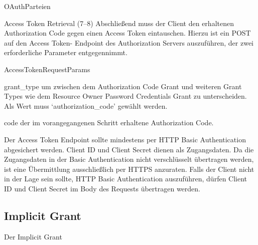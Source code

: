 \begin{labeling}{OAuthParteien}
    \item [Access Token Retrieval (7--8)]
    Abschließend muss der Client den erhaltenen Authorization Code gegen
    einen Access Token eintauschen. Hierzu ist ein POST auf den Access Token-
    Endpoint des Authorization Servers auszuführen, der zwei erforderliche
    Parameter entgegennimmt.
    \begin{labeling}{AccessTokenRequestParams}
        \item [grant\_type] um zwischen dem Authorization Code Grant und
        weiteren Grant Types wie dem Resource Owner Password Credentials Grant
        zu unterscheiden. Als Wert muss `authorization_code' gewählt werden.
        \item [code] der im vorangegangenen Schritt erhaltene Authorization
        Code.
    \end{labeling}
    Der Access Token Endpoint sollte mindestens per HTTP Basic Authentication
    abgesichert werden. Client ID und Client Secret dienen als Zugangsdaten.
    Da die Zugangsdaten in der Basic Authentication nicht verschlüsselt
    übertragen werden, ist eine Übermittlung ausschließlich per HTTPS anzuraten.
    Falls der Client nicht in der Lage sein sollte, HTTP Basic Authentication
    auszuführen, dürfen Client ID und Client Secret im Body des Requests
    übertragen werden.
\end{labeling}

\subsection{Implicit Grant}\label{ssec:implicit}
Der Implicit Grant

\blindtext{}
